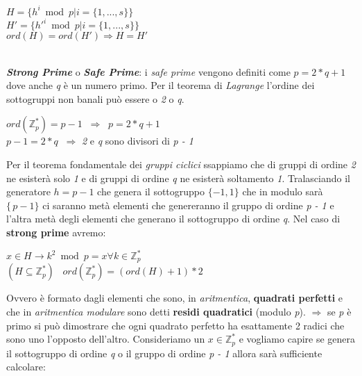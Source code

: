 \begin{center}
    $H = \{h^i \bmod p | i = \{1, ..., s\}\}$ \\
    $H' = \{h'^i \bmod p | i = \{1, ..., s\}\}$ \\
    $ord(H) = ord(H') \Rightarrow H = H'$ \\    
\end{center}
\   \\
\textbf{\textit{Strong Prime}} o \textbf{\textit{Safe Prime}}: i \textit{safe prime} vengono definiti come $p = 2*q + 1$ dove anche \textit{q} è un numero primo. Per il teorema di \textit{Lagrange} l'ordine dei sottogruppi non banali può essere o \textit{2} o \textit{q}.
\begin{center}
    $ord(\mathbb{Z}_p^*) = p - 1 \;\; \Rightarrow \;\; p = 2 * q + 1$ \\
    $p - 1 = 2 * q \;\; \Rightarrow$ \textit{2} e \textit{q} sono divisori di \textit{p - 1}
\end{center}
Per il teorema fondamentale dei \textit{gruppi ciclici} ssappiamo che di gruppi di ordine \textit{2} ne esisterà solo \textit{1} e di gruppi di ordine \textit{q} ne esisterà soltamento \textit{1}. Tralasciando il generatore $h = p - 1$ che genera il sottogruppo $\{-1, 1\}$ che in modulo sarà $\{\, p - 1\}$ ci saranno metà elementi che genereranno il gruppo di ordine \textit{p - 1} e l'altra metà degli elementi che generano il sottogruppo di ordine \textit{q}.
\newline
Nel caso di \textbf{strong prime} avremo:
\begin{center}
    $x \in H \rightarrow k^2 \bmod p = x \forall k \in \mathbb{Z}_p^*$ \\
    $(H \subseteq \mathbb{Z}_p^*) \;\;\; ord(\mathbb{Z}_p^*) = (ord(H) + 1) * 2$    
\end{center}
Ovvero è formato dagli elementi che sono, in \textit{aritmentica}, \textbf{quadrati perfetti} e che in \textit{aritmentica modulare} sono detti \textbf{residi quadratici} (modulo \textit{p}).
\newline
$\Rightarrow$ se \textit{p} è primo si può dimostrare che ogni quadrato perfetto ha esattamente 2 radici che sono uno l'opposto dell'altro. Consideriamo un $x \in \mathbb{Z}_p^*$ e vogliamo capire se genera il sottogruppo di ordine \textit{q} o il gruppo di ordine \textit{p - 1} allora sarà sufficiente calcolare:
\begin{center}
\end{center}

